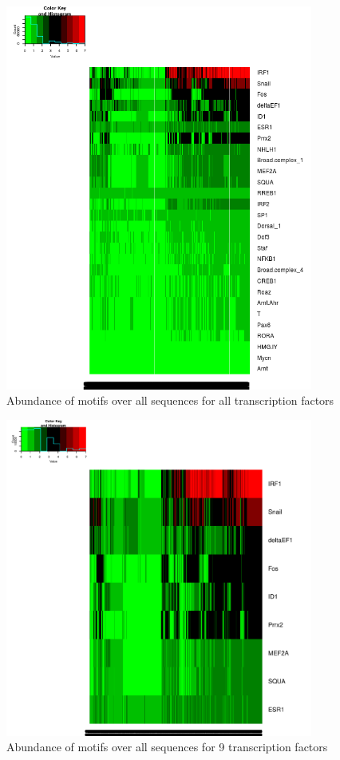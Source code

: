 \documentclass[12pt]{article}
\begin{document}
\begin{figure}[!htbp]
\centering
\includegraphics[width= 0.9\textwidth]{heatMapAllTFs.png}
\caption{Abundance of motifs over all sequences for all transcription factors} 
\label{heatmap}
\end{figure}

\begin{figure}[!htbp]
\centering
\includegraphics[width= 0.9\textwidth]{HeatmapTopNineTFs.pdf}
\caption{Abundance of motifs over all sequences for 9 transcription factors} 
\label{heatmap2}
\end{figure}
\end{document}
